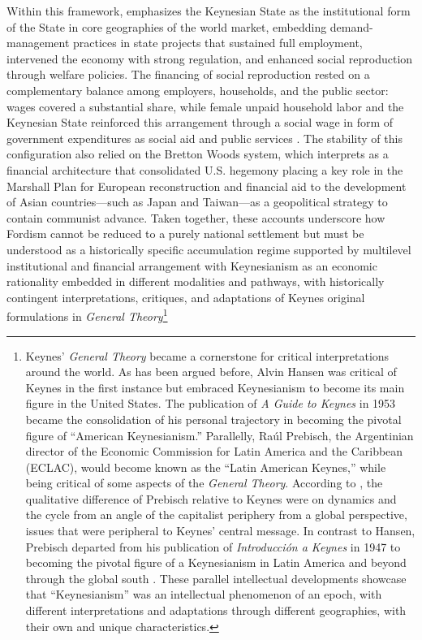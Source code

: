 \documentclass[11pt]{article}
\begin{document}
Within this framework, \citet{jessop2002} emphasizes the Keynesian State as the institutional form of the State in core geographies of the world market, embedding demand-management practices in state projects that sustained full employment, intervened the economy with strong regulation, and enhanced social reproduction through welfare policies. The financing of social reproduction rested on a complementary balance among employers, households, and the public sector: wages covered a substantial share, while female unpaid household labor and the Keynesian State reinforced this arrangement through a social wage in form of government expenditures as social aid and public services \citep{moos2021}. The stability of this configuration also relied on the Bretton Woods system, which \citet{vernengo2021} interprets as a financial architecture that consolidated U.S. hegemony placing a key role in the Marshall Plan  for European reconstruction and financial aid to the development of Asian countries---such as Japan and Taiwan---as a geopolitical strategy to contain communist advance. Taken together, these accounts underscore how Fordism cannot be reduced to a purely national settlement but must be understood as a historically specific accumulation regime supported by multilevel institutional and financial arrangement with Keynesianism as an economic rationality embedded in different modalities and pathways, with historically contingent interpretations, critiques, and adaptations of Keynes original formulations in \emph{General Theory}\footnote{Keynes' \emph{General Theory} became a cornerstone for critical interpretations around the world. As has been argued before, Alvin Hansen was critical of Keynes in the first instance but embraced Keynesianism to become its main figure in the United States. The publication of \emph{A Guide to Keynes} in 1953 became the consolidation of his personal trajectory in becoming the pivotal figure of ``American Keynesianism.'' Parallelly, Ra{\'u}l Prebisch, the Argentinian director of the Economic Commission for Latin America and the Caribbean (ECLAC), would become known as the ``Latin American Keynes,'' while being critical of some aspects of the \emph{General Theory}. According to \citet{caldenteyvernengo2016}, the qualitative difference of Prebisch relative to Keynes were on dynamics and the cycle from an angle of the capitalist periphery from a global perspective, issues that were peripheral to Keynes' central message. In contrast to Hansen, Prebisch departed from his publication of \emph{Introducci{\'o}n a Keynes} in 1947 to becoming the pivotal figure of a Keynesianism in Latin America and beyond through the global south \citep{prebisch1947}. These parallel intellectual developments showcase that ``Keynesianism'' was an intellectual phenomenon of an epoch, with different interpretations and adaptations through different geographies, with their own and unique characteristics.}
\end{document}
